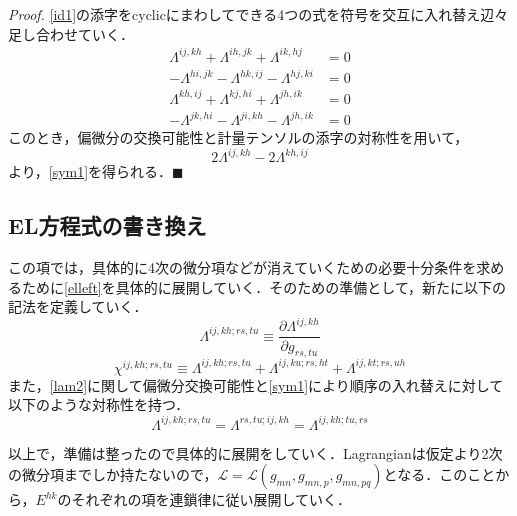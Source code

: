 \documentclass[12pt, a4paper]{jsarticle}
\newcommand{\lam}[1]{\varLambda^{#1}}
\newcommand{\x}[1]{\chi^{#1}}
\begin{document}
\textit{Proof.} \eqref{id1}の添字をcyclicにまわしてできる4つの式を符号を交互に入れ替え辺々足し合わせていく．
\begin{align*}
  \lam{ij,kh}+\lam{ih,jk}+\lam{ik,hj}  & = 0 \\
  -\lam{hi,jk}-\lam{hk,ij}-\lam{hj,ki} & = 0 \\
  \lam{kh,ij}+\lam{kj,hi}+\lam{jh,ik}  & = 0 \\
  -\lam{jk,hi}-\lam{ji,kh}-\lam{jh,ik} & = 0
\end{align*}
このとき，偏微分の交換可能性と計量テンソルの添字の対称性を用いて，
\begin{equation*}
  2\lam{ij,kh}-2\lam{kh,ij}
\end{equation*}
より，\eqref{sym1}を得られる．\(\blacksquare\)

\subsection{EL方程式の書き換え}
この項では，具体的に4次の微分項などが消えていくための必要十分条件を求めるために\eqref{elleft}を具体的に展開していく．そのための準備として，新たに以下の記法を定義していく．
\begin{equation*}
  \lam{ij,kh;rs,tu} \equiv \dfrac{\partial \lam{ij,kh}}{\partial g_{rs,tu} }
  \tag{2.10} \label{lam2}
\end{equation*}
\begin{equation*}
  \x{ij,kh;rs,tu} \equiv \lam{ij,kh;rs,tu} + \lam{ij,ku;rs,ht} + \lam{ij,kt;rs,uh}
  \tag{2.11} \label{chi}
\end{equation*}
また，\eqref{lam2}に関して偏微分交換可能性と\eqref{sym1}により順序の入れ替えに対して以下のような対称性を持つ．
\begin{equation*}
  \lam{ij,kh;rs,tu} = \lam{rs,tu;ij,kh} = \lam{ij,kh;tu,rs}
  \tag{2.12} \label{sym2}
\end{equation*}

以上で，準備は整ったので具体的に展開をしていく．Lagrangianは仮定より2次の微分項までしか持たないので，\(\mathscr{L} = \mathscr{L}(g_{mn}, g_{mn,p}, g_{mn,pq})\)となる．このことから，\(E^{hk}\)のそれぞれの項を連鎖律に従い展開していく．
\end{document}
